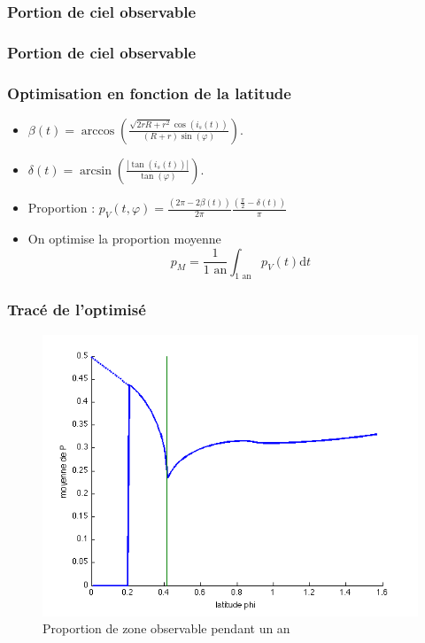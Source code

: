 \documentclass{beamer}
\newcommand{\dd}{\mathrm d}
\begin{document}
\begin{frame}
\frametitle{Portion de ciel observable}
  
\end{frame}

\begin{frame}
\frametitle{Portion de ciel observable}
  
\end{frame}

\begin{frame}
\frametitle{Optimisation en fonction de la latitude}

\begin{itemize}
\item $\displaystyle{\beta(t)=\arccos\left(\frac{\sqrt{2rR+r^2}\cos(i_s(t))}{(R+r)\sin(\varphi)}\right)}$.
\item $\displaystyle{\delta(t)=\arcsin\left(\frac{|\tan(i_s(t))|}{\tan(\varphi)}\right)}$.
\item Proportion : $\displaystyle{p_{V}(t,\varphi)=\frac{(2\pi-2\beta(t))}{2\pi}\frac{(\frac{\pi}{2}-\delta(t))}{\pi}}$
\item On optimise la proportion moyenne $$p_{M}= \frac 1 {1 \text{ an}}\int_{\text{1 an}} p_{V}(t) \dd t$$
\end{itemize}



  
\end{frame}

\begin{frame}
\frametitle{Tracé de l'optimisé}


 \begin{figure}[h]
    \centering
    \includegraphics[width=.6\textwidth]{opt.png}
    \caption{Proportion de zone observable pendant un an}
 \end{figure}

  
\end{frame}
\end{document}
